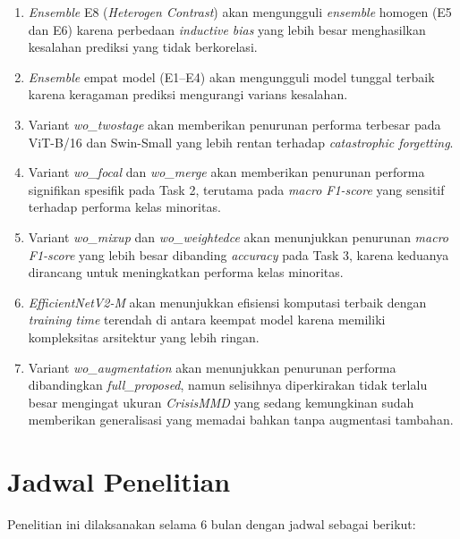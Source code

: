 \begin{enumerate}[noitemsep]
    \item \textit{Ensemble} E8 (\textit{Heterogen Contrast}) akan
    mengungguli \textit{ensemble} homogen (E5 dan E6) karena perbedaan
    \textit{inductive bias} yang lebih besar menghasilkan kesalahan
    prediksi yang tidak berkorelasi.
    \item \textit{Ensemble} empat model (E1--E4) akan mengungguli model
    tunggal terbaik karena keragaman prediksi mengurangi varians
    kesalahan.
    \item Variant \textit{wo\_twostage} akan memberikan penurunan
    performa terbesar pada ViT-B/16 dan Swin-Small yang lebih rentan
    terhadap \textit{catastrophic forgetting}.
    \item Variant \textit{wo\_focal} dan \textit{wo\_merge} akan
    memberikan penurunan performa signifikan spesifik pada Task 2,
    terutama pada \textit{macro F1-score} yang sensitif terhadap
    performa kelas minoritas.
    \item Variant \textit{wo\_mixup} dan \textit{wo\_weightedce} akan
    menunjukkan penurunan \textit{macro F1-score} yang lebih besar
    dibanding \textit{accuracy} pada Task 3, karena keduanya dirancang
    untuk meningkatkan performa kelas minoritas.
    \item \textit{EfficientNetV2-M} akan menunjukkan efisiensi
    komputasi terbaik dengan \textit{training time} terendah di antara
    keempat model karena memiliki kompleksitas arsitektur yang lebih
    ringan.
    \item Variant \textit{wo\_augmentation} akan menunjukkan penurunan
    performa dibandingkan \textit{full\_proposed}, namun selisihnya
    diperkirakan tidak terlalu besar mengingat ukuran \textit{CrisisMMD}
    yang sedang kemungkinan sudah memberikan generalisasi yang memadai
    bahkan tanpa augmentasi tambahan.
\end{enumerate}

\section{Jadwal Penelitian} \label{III.Jadwal}
Penelitian ini dilaksanakan selama 6 bulan dengan jadwal sebagai
berikut: \par

